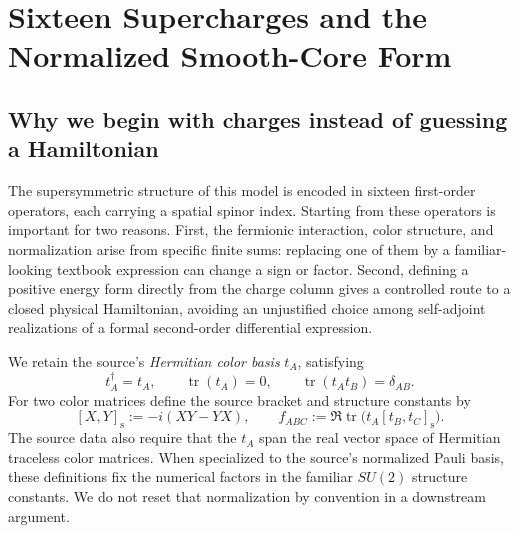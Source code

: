 \chapter[Supercharges and Source Core Form]{Sixteen Supercharges and the Normalized Smooth-Core Form}
\label{ch:charges}

\section{Why we begin with charges instead of guessing a Hamiltonian}
The supersymmetric structure of this model is encoded in sixteen first-order
operators, each carrying a spatial spinor index. Starting from these
operators is important for two reasons. First, the fermionic interaction,
color structure, and normalization arise from specific finite sums: replacing
one of them by a familiar-looking textbook expression can change a sign or
factor. Second, defining a positive energy form directly from the charge
column gives a controlled route to a closed physical Hamiltonian, avoiding
an unjustified choice among self-adjoint realizations of a formal second-order
differential expression.

We retain the source's \emph{Hermitian color basis} $t_A$, satisfying
\begin{equation}\label{eq:color-basis}
 t_A^\dagger=t_A,\qquad \operatorname{tr}(t_A)=0,
 \qquad \operatorname{tr}(t_A t_B)=\delta_{AB}.
\end{equation}
For two color matrices define the source bracket and structure constants by
\begin{equation}\label{eq:source-bracket}
 [X,Y]_{\mathrm{s}}:=-i(XY-YX),\qquad
 f_{ABC}:=\Re\operatorname{tr}\bigl(t_A[t_B,t_C]_{\mathrm{s}}\bigr).
\end{equation}
The source data also require that the $t_A$ span the real vector space of
Hermitian traceless color matrices. When specialized to the source's
normalized Pauli basis, these definitions fix the numerical factors in the
familiar $SU(2)$ structure constants. We do not reset that normalization
by convention in a downstream argument.


